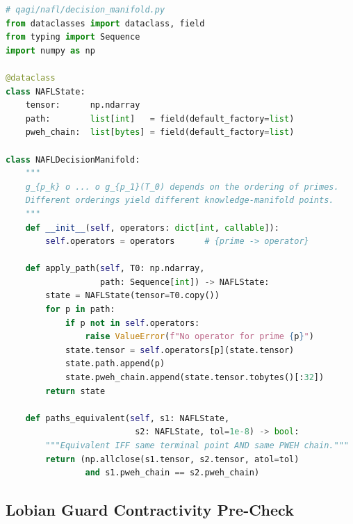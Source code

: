 \documentclass[12pt,a4paper]{article}
\theoremstyle{definition}
\theoremstyle{plain}
\theoremstyle{remark}
\begin{document}
\begin{lstlisting}[language=Python, style=pythonstyle,
  caption={NAFL path-dependent prime-ordered operator application},
  label={lst:nafl}]
# qagi/nafl/decision_manifold.py
from dataclasses import dataclass, field
from typing import Sequence
import numpy as np

@dataclass
class NAFLState:
    tensor:      np.ndarray
    path:        list[int]   = field(default_factory=list)
    pweh_chain:  list[bytes] = field(default_factory=list)

class NAFLDecisionManifold:
    """
    g_{p_k} o ... o g_{p_1}(T_0) depends on the ordering of primes.
    Different orderings yield different knowledge-manifold points.
    """
    def __init__(self, operators: dict[int, callable]):
        self.operators = operators      # {prime -> operator}

    def apply_path(self, T0: np.ndarray,
                   path: Sequence[int]) -> NAFLState:
        state = NAFLState(tensor=T0.copy())
        for p in path:
            if p not in self.operators:
                raise ValueError(f"No operator for prime {p}")
            state.tensor = self.operators[p](state.tensor)
            state.path.append(p)
            state.pweh_chain.append(state.tensor.tobytes()[:32])
        return state

    def paths_equivalent(self, s1: NAFLState,
                          s2: NAFLState, tol=1e-8) -> bool:
        """Equivalent IFF same terminal point AND same PWEH chain."""
        return (np.allclose(s1.tensor, s2.tensor, atol=tol)
                and s1.pweh_chain == s2.pweh_chain)
\end{lstlisting}

\subsection{Lobian Guard Contractivity Pre-Check}
\end{document}
